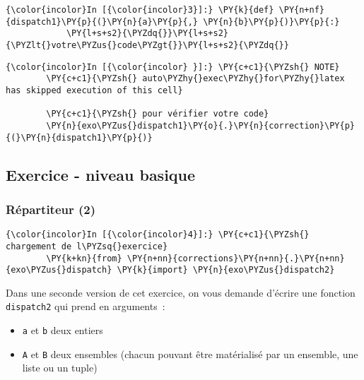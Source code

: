     \begin{Verbatim}[commandchars=\\\{\}]
{\color{incolor}In [{\color{incolor}3}]:} \PY{k}{def} \PY{n+nf}{dispatch1}\PY{p}{(}\PY{n}{a}\PY{p}{,} \PY{n}{b}\PY{p}{)}\PY{p}{:}
            \PY{l+s+s2}{\PYZdq{}}\PY{l+s+s2}{\PYZlt{}votre\PYZus{}code\PYZgt{}}\PY{l+s+s2}{\PYZdq{}}
\end{Verbatim}


    \begin{Verbatim}[commandchars=\\\{\}]
{\color{incolor}In [{\color{incolor} }]:} \PY{c+c1}{\PYZsh{} NOTE}
        \PY{c+c1}{\PYZsh{} auto\PYZhy{}exec\PYZhy{}for\PYZhy{}latex has skipped execution of this cell}
        
        \PY{c+c1}{\PYZsh{} pour vérifier votre code}
        \PY{n}{exo\PYZus{}dispatch1}\PY{o}{.}\PY{n}{correction}\PY{p}{(}\PY{n}{dispatch1}\PY{p}{)}
\end{Verbatim}


    \hypertarget{exercice---niveau-basique}{%
\subsection{Exercice - niveau basique}\label{exercice---niveau-basique}}

    \hypertarget{ruxe9partiteur-2}{%
\subsubsection{Répartiteur (2)}\label{ruxe9partiteur-2}}

    \begin{Verbatim}[commandchars=\\\{\}]
{\color{incolor}In [{\color{incolor}4}]:} \PY{c+c1}{\PYZsh{} chargement de l\PYZsq{}exercice}
        \PY{k+kn}{from} \PY{n+nn}{corrections}\PY{n+nn}{.}\PY{n+nn}{exo\PYZus{}dispatch} \PY{k}{import} \PY{n}{exo\PYZus{}dispatch2}
\end{Verbatim}


    Dans une seconde version de cet exercice, on vous demande d'écrire une
fonction \texttt{dispatch2} qui prend en arguments~:

\begin{itemize}
\tightlist
\item
  \texttt{a} et \texttt{b} deux entiers
\item
  \texttt{A} et \texttt{B} deux ensembles (chacun pouvant être
  matérialisé par un ensemble, une liste ou un tuple)
\end{itemize}

